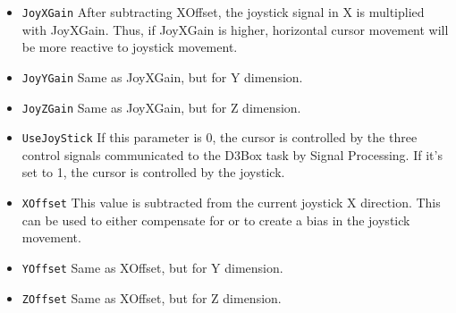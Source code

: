 \documentclass[letterpaper,oneside,12pt]{article}
\begin{document}
\begin{itemize}
  \item {\tt JoyXGain} After subtracting XOffset, the joystick signal
        in X is multiplied with JoyXGain. Thus, if JoyXGain is higher,
        horizontal cursor movement will be more reactive to joystick
        movement.
  \item {\tt JoyYGain} Same as JoyXGain, but for Y dimension.
  \item {\tt JoyZGain} Same as JoyXGain, but for Z dimension.
  \item {\tt UseJoyStick} If this parameter is 0, the cursor is controlled
        by the three control signals communicated to the D3Box task by
        Signal Processing. If it's set to 1, the cursor is controlled by the joystick.
  \item {\tt XOffset} This value is subtracted from the current
        joystick X direction. This can be used to either compensate for
        or to create a bias in the joystick movement.
  \item {\tt YOffset} Same as XOffset, but for Y dimension.
  \item {\tt ZOffset} Same as XOffset, but for Z dimension.
\end{itemize}
\end{document}
